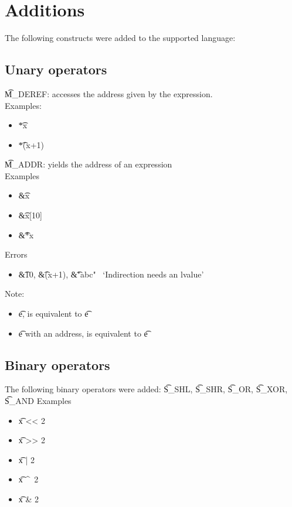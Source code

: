 \section{Additions}

The following constructs were added to the supported language:

\subsection{Unary operators}
\t{M\_DEREF}: accesses the address given by the expression.\\
Examples:
\begin{itemize}
    \item \t{*x} \to\ 
    \item \t{*(x+1)} \to\ 
\end{itemize}

\t{M\_ADDR}: yields the address of an expression\\
Examples
\begin{itemize}
    \item \t{\&x} \to\ 
    \item \t{\&x[10]} \to\ 
    \item \t{\&*x} \to\ 
\end{itemize}
Errors
\begin{itemize}
    \item \t{\&10}, \t{\&(x+1)}, \t{\&"abc"} \to\ `Indirection needs an lvalue'
\end{itemize}

Note:
\begin{itemize}
    \item \forall \t{e},  is equivalent to \t{e}
    \item \forall \t{e} with an address,  is equivalent to \t{e}
\end{itemize}


\subsection{Binary operators}
The following binary operators were added:
\t{S\_SHL}, \t{S\_SHR}, \t{S\_OR}, \t{S\_XOR}, \t{S\_AND}
Examples
\begin{itemize}
    \item \t{x << 2} \to\ 
    \item \t{x >> 2} \to\ 
    \item \t{x | 2} \to\ 
    \item \t{x \textasciicircum\ 2} \to\ 
    \item \t{x \& 2} \to\ 
\end{itemize}

